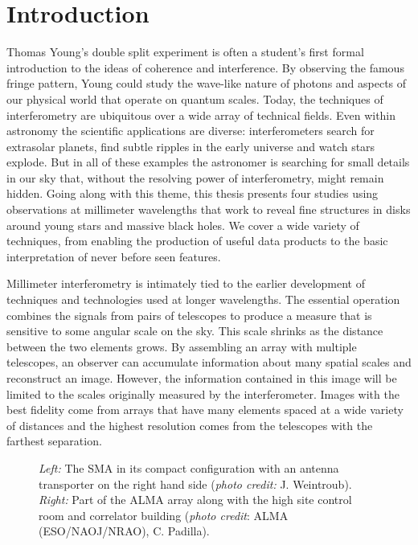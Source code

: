 \chapter{Introduction}\label{chapter:introduction}

Thomas Young's double split experiment is often a student's first formal introduction to the ideas of 
coherence and interference.  By observing the famous fringe pattern, Young could study the wave-like nature of 
photons and aspects of our physical world that operate on quantum scales.  Today, the techniques of interferometry
are ubiquitous over a wide array of technical fields.  Even within astronomy the scientific applications are 
diverse: interferometers  search for extrasolar planets, find subtle ripples in the early universe and watch 
stars explode.  But in all of these examples the astronomer is searching for small details in our sky that, 
without the resolving power of interferometry, might remain hidden.  Going along with this theme, this thesis 
presents four studies using observations at millimeter wavelengths that work to reveal fine structures in disks 
around young stars and massive black holes.  We cover a wide variety of techniques, from enabling the production 
of useful data products to the basic interpretation of never before seen features.

Millimeter interferometry is intimately tied to the earlier development of techniques and technologies 
used at longer wavelengths.  The essential operation combines the signals from pairs of telescopes to produce a 
measure that is sensitive to some angular scale on the sky.  This scale shrinks as the distance
between the two elements grows.  By assembling an array with multiple 
telescopes, an observer can accumulate information about many spatial scales and reconstruct an image.  However,
the information contained in this image will be limited to the scales originally measured by the interferometer.
Images with the best fidelity come from arrays that have many elements spaced at a wide variety of 
distances and the highest resolution comes from the telescopes with the farthest separation.

\begin{figure}[t!]
\caption{{\it Left:} The SMA in its compact configuration with an antenna transporter on the right hand side 
({\it photo credit:} J. Weintroub).  {\it Right:} Part of the ALMA array along with the high site control room and correlator building ({\it photo credit}: ALMA (ESO/NAOJ/NRAO), C. Padilla).}
\label{fig:sma_alma}
\end{figure}

